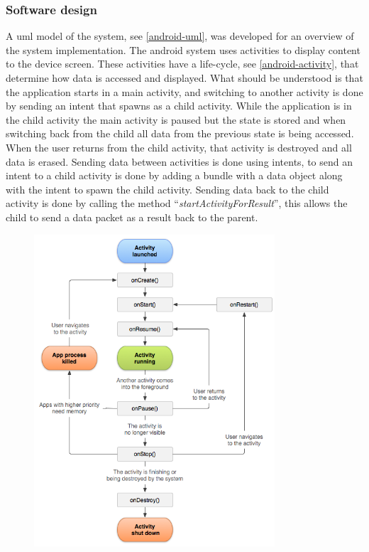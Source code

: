 \subsubsection{Software design}
A \gls{uml}\cite{uml} model of the system, see \autoref{android-uml}, was developed for an overview of the system implementation. The android system uses activities\cite{activity} to display content to the device screen. These activities have a life-cycle, see \autoref{android-activity}, that determine how data is accessed and displayed. What should be understood is that the application starts in a main activity, and switching to another activity is done by sending an intent that spawns as a child activity.
While the application is in the child activity the main activity is paused but the state is stored and when switching back from the child all data from the previous state is being accessed.
When the user returns from the child activity,  that activity is destroyed and all data is erased.
Sending data between activities is done using intents, to send an intent to a child activity is done by adding a bundle with a data object along with the intent to spawn the child activity.
Sending data back to the child activity is done by calling the method ``\emph{startActivityForResult}'', this allows the child to send a data packet as a result back to the parent. 
\begin{figure}[H]
\centering
\includegraphics[width=0.8\textwidth]{Figures/activity_lifecycle.png}
\label{android-activity}
\end{figure}

